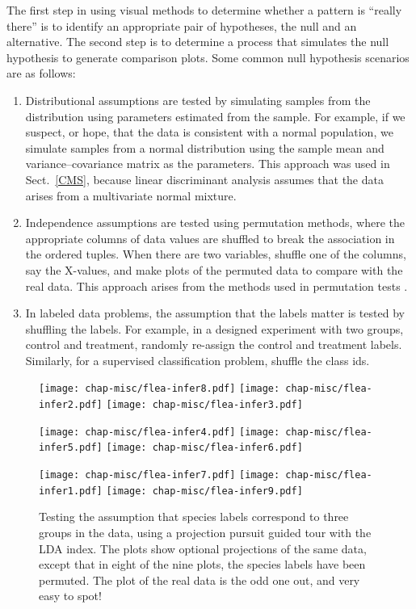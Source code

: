 The first step in using visual methods to determine whether a pattern
is ``really there'' is to identify an appropriate pair of hypotheses,
the null and an alternative.  The second step is to determine a
process that simulates the null hypothesis to generate comparison
plots. Some common null hypothesis scenarios are as follows:

\begin{enumerate}
\item Distributional assumptions are tested by simulating
samples from the distribution using parameters estimated from the
sample. For example, if we suspect, or hope, that the data is
consistent with a normal population, we simulate samples from a normal
distribution using the sample mean and variance--covariance matrix as
the parameters. This approach was used in Sect.~\ref{CMS}, because
linear discriminant analysis assumes that the data arises from a
multivariate normal mixture.

\item Independence assumptions are tested using permutation methods,
where the appropriate columns of data values are shuffled to break the
association in the ordered tuples.  When there are two variables,
shuffle one of the columns, say the X-values, and make plots of the
permuted data to compare with the real data. This approach arises from
the methods used in permutation tests \cite{Good05}.

\item In labeled data problems, the assumption that the labels matter
is tested by shuffling the labels. For example, in a designed
experiment with two groups, control and treatment, randomly re-assign
the control and treatment labels. Similarly, for a supervised
classification problem, shuffle the class ids.
\end{enumerate}

\begin{figure*}[htp]
\centerline{{\texttt{[image: chap-misc/flea-infer8.pdf]}}
  {\texttt{[image: chap-misc/flea-infer2.pdf]}}
  {\texttt{[image: chap-misc/flea-infer3.pdf]}}}
\centerline{{\texttt{[image: chap-misc/flea-infer4.pdf]}}
  {\texttt{[image: chap-misc/flea-infer5.pdf]}}
  {\texttt{[image: chap-misc/flea-infer6.pdf]}}}
\centerline{{\texttt{[image: chap-misc/flea-infer7.pdf]}}
  {\texttt{[image: chap-misc/flea-infer1.pdf]}}
  {\texttt{[image: chap-misc/flea-infer9.pdf]}}}
\caption[Testing the assumption that species labels correspond to
groups in the data]{Testing the assumption that species labels
correspond to three groups in the data, using a projection pursuit
guided tour with the LDA index. The plots show optional projections of
the same data, except that in eight of the nine plots, the species
labels have been permuted.  The plot of the real data is the odd one
out, and very easy to spot!}
\label{inf2}
\end{figure*}

